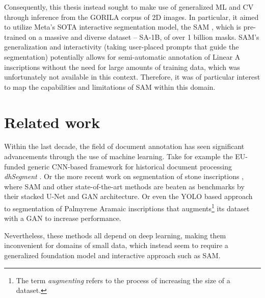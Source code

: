 Consequently, this thesis instead sought to make use of generalized \acf{ML} and \acf{CV} through inference from the \acs{GORILA} corpus of 2D images.
In particular, it aimed to utilize Meta's \acf{SOTA} interactive segmentation model, the \acf{SAM} \parencite{sam}, which is pre-trained on a massive and diverse dataset -- \acf{SA-1B}, of over 1 billion masks.
\acs{SAM}'s generalization and interactivity (taking user-placed prompts that guide the segmentation) potentially allows for semi-automatic annotation of Linear A inscriptions without the need for large amounts of training data, which was unfortunately not available in this context.
Therefore, it was of particular interest to map the capabilities and limitations of \acs{SAM} within this domain.


\section{Related work}
Within the last decade, the field of document annotation has seen significant advancements through the use of machine learning.
Take for example the EU-funded generic \acs{CNN}-based framework for historical document processing \textit{dhSegment} \parencite{dhsegment}.
Or the more recent work on segmentation of stone inscriptions \parencite{DeepLearningSegmentation}, where \acs{SAM} and other state-of-the-art methods are beaten as benchmarks by their stacked U-Net \parencite{UNET2015} and \acf{GAN} \parencite{GAN2014} architecture.
Or even the \acs{YOLO} \parencite{YOLO} based approach to segmentation of Palmyrene Aramaic inscriptions \parencite{YOLOSegmentation} that augments\footnote{The term \textit{augmenting} refers to the process of increasing the size of a dataset.} its dataset with a \acs{GAN} to increase performance.

Nevertheless, these methods all depend on deep learning, making them inconvenient for domains of small data, which instead seem to require a generalized foundation model and interactive approach such as \acs{SAM}.

